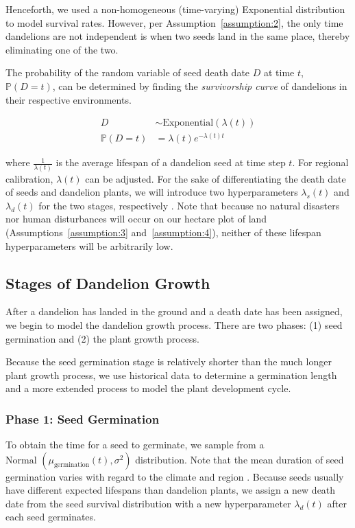 Henceforth, we used a non-homogeneous (time-varying) Exponential distribution to model survival rates. However, per Assumption~\ref{assumption:2}, the only time dandelions are not independent is when two seeds land in the same place, thereby eliminating one of the two.

The probability of the random variable of seed death date \(D\) at time \(t\), \(\mathbb{P}(D = t)\), can be determined by finding the \textit{survivorship curve} of dandelions in their respective environments. 

\begin{align}
    D & \sim \text{Exponential}(\lambda(t)) \nonumber  \\
    \mathbb{P}(D = t) & = \lambda(t) e^{-\lambda(t) t}
\end{align}

where \(\frac{1}{\lambda(t)}\) is the average lifespan of a dandelion seed at time step \(t\). For regional calibration, \(\lambda(t)\) can be adjusted. For the sake of differentiating the death date of seeds and dandelion plants, we will introduce two hyperparameters \(\lambda_s(t)\) and \(\lambda_d(t)\) for the two stages, respectively \cite{board_of_pesticides_control_maine_dacf_dandelion-taraxacum_nodate}. Note that because no natural disasters nor human disturbances will occur on our hectare plot of land (Assumptions~\ref{assumption:3} and~\ref{assumption:4}), neither of these lifespan hyperparameters will be arbitrarily low.

\subsection{Stages of Dandelion Growth}

After a dandelion has landed in the ground and a death date has been assigned, we begin to model the dandelion growth process. There are two phases: (1) seed germination and (2) the plant growth process.

Because the seed germination stage is relatively shorter than the much longer plant growth process, we use historical data to determine a germination length and a more extended process to model the plant development cycle.

\subsubsection{Phase 1: Seed Germination}

To obtain the time for a seed to germinate, we sample from a \(\text{Normal } (\mu_{\text{germination}}(t), \sigma^2)\) distribution. Note that the mean duration of seed germination varies with regard to the climate and region \cite{board_of_pesticides_control_maine_dacf_dandelion-taraxacum_nodate}. Because seeds usually have different expected lifespans than dandelion plants, we assign a new death date from the seed survival distribution with a new hyperparameter \(\lambda_d(t)\) after each seed germinates.

